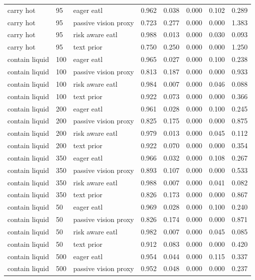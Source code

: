 \begin{longtable}{lllrrrrr}
carry hot & 95 & eager eatl & 0.962 & 0.038 & 0.000 & 0.102 & 0.289 \\
carry hot & 95 & passive vision proxy & 0.723 & 0.277 & 0.000 & 0.000 & 1.383 \\
carry hot & 95 & risk aware eatl & 0.988 & 0.013 & 0.000 & 0.030 & 0.093 \\
carry hot & 95 & text prior & 0.750 & 0.250 & 0.000 & 0.000 & 1.250 \\
contain liquid & 100 & eager eatl & 0.965 & 0.027 & 0.000 & 0.100 & 0.238 \\
contain liquid & 100 & passive vision proxy & 0.813 & 0.187 & 0.000 & 0.000 & 0.933 \\
contain liquid & 100 & risk aware eatl & 0.984 & 0.007 & 0.000 & 0.046 & 0.088 \\
contain liquid & 100 & text prior & 0.922 & 0.073 & 0.000 & 0.000 & 0.366 \\
contain liquid & 200 & eager eatl & 0.961 & 0.028 & 0.000 & 0.100 & 0.245 \\
contain liquid & 200 & passive vision proxy & 0.825 & 0.175 & 0.000 & 0.000 & 0.875 \\
contain liquid & 200 & risk aware eatl & 0.979 & 0.013 & 0.000 & 0.045 & 0.112 \\
contain liquid & 200 & text prior & 0.922 & 0.070 & 0.000 & 0.000 & 0.354 \\
contain liquid & 350 & eager eatl & 0.966 & 0.032 & 0.000 & 0.108 & 0.267 \\
contain liquid & 350 & passive vision proxy & 0.893 & 0.107 & 0.000 & 0.000 & 0.533 \\
contain liquid & 350 & risk aware eatl & 0.988 & 0.007 & 0.000 & 0.041 & 0.082 \\
contain liquid & 350 & text prior & 0.826 & 0.173 & 0.000 & 0.000 & 0.867 \\
contain liquid & 50 & eager eatl & 0.969 & 0.028 & 0.000 & 0.100 & 0.240 \\
contain liquid & 50 & passive vision proxy & 0.826 & 0.174 & 0.000 & 0.000 & 0.871 \\
contain liquid & 50 & risk aware eatl & 0.982 & 0.007 & 0.000 & 0.045 & 0.085 \\
contain liquid & 50 & text prior & 0.912 & 0.083 & 0.000 & 0.000 & 0.420 \\
contain liquid & 500 & eager eatl & 0.954 & 0.044 & 0.000 & 0.115 & 0.337 \\
contain liquid & 500 & passive vision proxy & 0.952 & 0.048 & 0.000 & 0.000 & 0.237 \\

\end{longtable}
